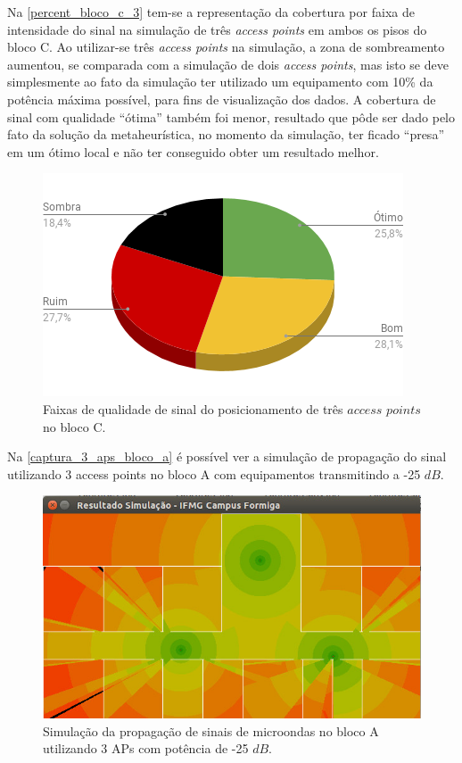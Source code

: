 \documentclass[
	12pt,				%
	twoside,			%
	a4paper,			%
	english,			%
	french,				%
	spanish,			%
	brazil				%
	]{abntex2}
\begin{document}
Na \autoref{percent_bloco_c_3} tem-se a representação da cobertura por
faixa de intensidade do sinal na simulação de três \emph{access points}
em ambos os pisos do bloco C. Ao utilizar-se três \emph{access points}
na simulação, a zona de sombreamento aumentou, se comparada com a
simulação de dois \emph{access points}, mas isto se deve simplesmente ao
fato da simulação ter utilizado um equipamento com 10\% da potência
máxima possível, para fins de visualização dos dados. A cobertura de
sinal com qualidade ``ótima'' também foi menor, resultado que pôde ser
dado pelo fato da solução da metaheurística, no momento da simulação,
ter ficado ``presa'' em um ótimo local e não ter conseguido obter um
resultado melhor.

\begin{figure}[ht]
    \caption{\label{percent_bloco_c_3} Faixas de qualidade de sinal do posicionamento de três $access$ $points$ no bloco C.}
    \begin{center}
        \includegraphics[scale=0.7]{imagens/percent-bloco-c-3.png}
    \end{center}
\end{figure}

Na \autoref{captura_3_aps_bloco_a} é possível ver a simulação de
propagação do sinal utilizando 3 access points no bloco A com
equipamentos transmitindo a -25 \(dB\).

\begin{figure}[ht]
    \caption{\label{captura_3_aps_bloco_a} Simulação da propagação de sinais de microondas no bloco A utilizando 3 APs com potência de -25 $dB$.}
    \begin{center}
        \includegraphics[scale=0.7]{imagens/captura-3-aps-bloco-a.jpg}
    \end{center}
\end{figure}
\end{document}
